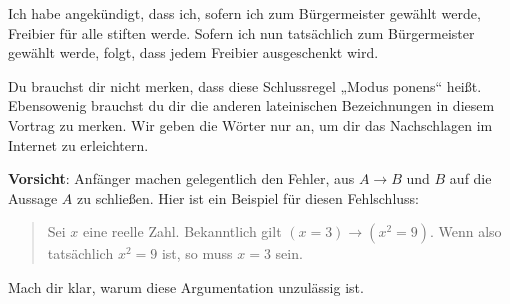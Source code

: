 \begin{bsp}
Ich habe angekündigt, dass ich, sofern ich zum Bürgermeister gewählt werde, Freibier für alle stiften werde. Sofern ich nun tatsächlich zum Bürgermeister gewählt werde, folgt, dass jedem Freibier ausgeschenkt wird.
\end{bsp}

\begin{bem}
 Du brauchst dir nicht merken, dass diese Schlussregel „Modus ponens“ heißt. Ebensowenig brauchst du dir die anderen lateinischen Bezeichnungen in diesem Vortrag zu merken. Wir geben die Wörter nur an, um dir das Nachschlagen im Internet zu erleichtern.
\end{bem}


  \begin{bem}
\textbf{Vorsicht}: Anfänger machen gelegentlich den Fehler, aus $A\to B$ und $B$ auf die Aussage $A$ zu schließen. Hier ist ein Beispiel für diesen Fehlschluss:
\begin{quote}
Sei $x$ eine reelle Zahl. Bekanntlich gilt $(x=3)\to (x^2=9)$. Wenn also tatsächlich $x^2=9$ ist, so muss $x=3$ sein.
\end{quote}
Mach dir klar, warum diese Argumentation unzulässig ist.%
\end{bem}


